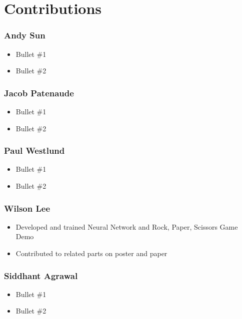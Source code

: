 \section{Contributions}

\subsubsection*{Andy Sun}
\begin{itemize}
\item Bullet \#1
\item Bullet \#2
\end{itemize}

\subsubsection*{Jacob Patenaude}
\begin{itemize}
\item Bullet \#1
\item Bullet \#2
\end{itemize}

\subsubsection*{Paul Westlund}
\begin{itemize}
\item Bullet \#1
\item Bullet \#2
\end{itemize}

\subsubsection*{Wilson Lee}
\begin{itemize}
\item Developed and trained Neural Network and Rock, Paper, Scissors Game Demo
\item Contributed to related parts on poster and paper
\end{itemize}

\subsubsection*{Siddhant Agrawal}
\begin{itemize}
\item Bullet \#1
\item Bullet \#2
\end{itemize}
